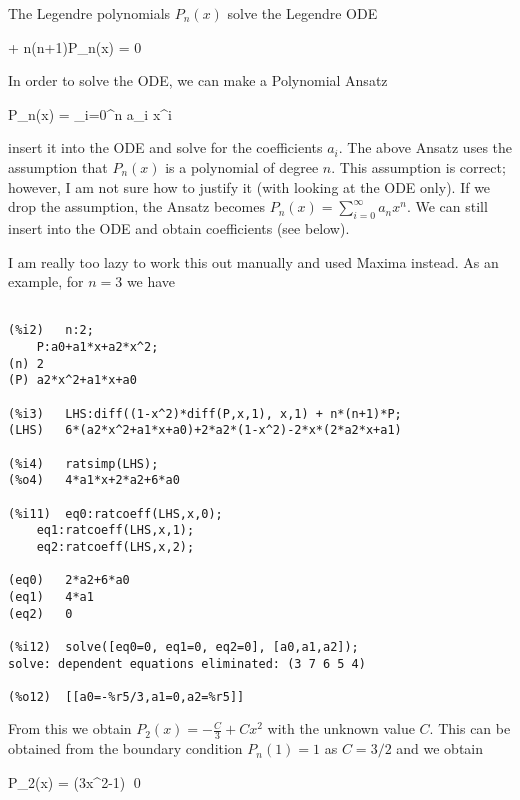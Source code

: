 
The Legendre polynomials $P_n(x)$ solve the Legendre ODE

\bee
{}  + n(n+1)P_n(x) = 0
\eee

In order to solve the ODE, we can make a Polynomial Ansatz

\bee
P_n(x) = \sum_{i=0}^n a_i x^i
\eee

insert it into the ODE and solve for the coefficients $a_i$. The above Ansatz uses the assumption that $P_n(x)$ is a polynomial of degree $n$. This assumption is correct; however, I am not sure how to justify it (with looking at the ODE only). If we drop the assumption, the Ansatz becomes $P_n(x) = \sum_{i=0}^\infty a_n x^n$. We can still insert into the ODE and obtain coefficients (see below).

I am really too lazy to work this out manually and used Maxima instead. As an example, for $n=3$ we have

\begin{verbatim}

(%i2)	n:2;
	P:a0+a1*x+a2*x^2;
(n)	2
(P)	a2*x^2+a1*x+a0

(%i3)	LHS:diff((1-x^2)*diff(P,x,1), x,1) + n*(n+1)*P;
(LHS)	6*(a2*x^2+a1*x+a0)+2*a2*(1-x^2)-2*x*(2*a2*x+a1)

(%i4)	ratsimp(LHS);
(%o4)	4*a1*x+2*a2+6*a0

(%i11)	eq0:ratcoeff(LHS,x,0);
	eq1:ratcoeff(LHS,x,1);
	eq2:ratcoeff(LHS,x,2);

(eq0)	2*a2+6*a0
(eq1)	4*a1
(eq2)	0

(%i12)	solve([eq0=0, eq1=0, eq2=0], [a0,a1,a2]);
solve: dependent equations eliminated: (3 7 6 5 4)

(%o12)	[[a0=-%r5/3,a1=0,a2=%r5]]

\end{verbatim}

From this we obtain $P_2(x) = -\frac{C}{3} + Cx^2$ with the unknown value $C$. This can be obtained from the boundary condition $P_n(1) = 1$ as $C = 3/2$ and we obtain

\bee
P_2(x) = (3x^2-1) \qed
\eee


